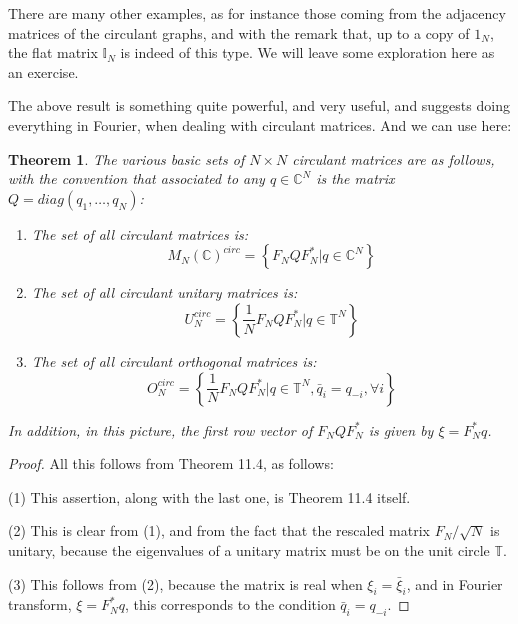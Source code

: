 \documentclass[12pt]{amsbook}
\newtheorem{theorem}{Theorem}[chapter]
\begin{document}
There are many other examples, as for instance those coming from the adjacency matrices of the circulant graphs, and with the remark that, up to a copy of $1_N$, the flat matrix $\mathbb I_N$ is indeed of this type. We will leave some exploration here as an exercise.

\bigskip

The above result is something quite powerful, and very useful, and suggests doing everything in Fourier, when dealing with circulant matrices. And we can use here:


\begin{theorem}
The various basic sets of $N\times N$ circulant matrices are as follows, with the convention that associated to any $q\in\mathbb C^N$ is the matrix  $Q=diag(q_1,\ldots,q_N)$:
\begin{enumerate}
\item The set of all circulant matrices is:
$$M_N(\mathbb C)^{circ}=\left\{F_NQF_N^*\Big|q\in\mathbb C^N\right\}$$

\item The set of all circulant unitary matrices is:
$$U_N^{circ}=\left\{\frac{1}{N}F_NQF_N^*\Big|q\in\mathbb T^N\right\}$$

\item The set of all circulant orthogonal matrices is:
$$O_N^{circ}=\left\{\frac{1}{N}F_NQF_N^*\Big|q\in\mathbb T^N,\bar{q}_i=q_{-i},\forall i\right\}$$
\end{enumerate}
In addition, in this picture, the first row vector of $F_NQF_N^*$ is given by $\xi=F_N^*q$.
\end{theorem}

\begin{proof}
All this follows from Theorem 11.4, as follows:

\medskip

(1) This assertion, along with the last one, is Theorem 11.4 itself.

\medskip

(2) This is clear from (1), and from the fact that the rescaled matrix $F_N/\sqrt{N}$ is unitary, because the eigenvalues of a unitary matrix must be on the unit circle $\mathbb T$.

\medskip

(3) This follows from (2), because the matrix is real when $\xi_i=\bar{\xi}_i$, and in Fourier transform, $\xi=F_N^*q$, this corresponds to the condition $\bar{q}_i=q_{-i}$.
\end{proof}
\end{document}
